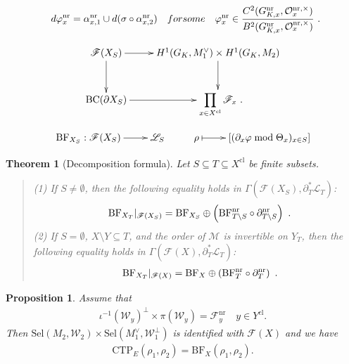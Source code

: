 \documentclass[10pt,a4paper]{amsart}
\newtheorem{thm}{Theorem}
\newtheorem{prop}{Proposition}
\begin{document}
\begin{align}\label{BFnrx-lift}
    d\varphi_x^\mathrm{nr}=\alpha_{x,1}^\mathrm{nr}\cup d(\sigma\circ\alpha_{x,2}^\mathrm{nr})\quad\textrm{for some}\quad\varphi_x^\mathrm{nr}\in\frac{C^2(G_{K,x}^\mathrm{nr},\mathcal{O}_x^{\mathrm{nr},\times})}{B^2(G_{K,x}^\mathrm{nr},\mathcal{O}_x^{\mathrm{nr},\times})}\rlap{\ .}
\end{align}

\begin{align}\label{FXS-defn}
\begin{aligned}
    \xymatrix{
    \mathscr{F}(X_S) \ar[d] \ar[r] & H^1(G_K,M_1^\vee)\times H^1(G_K,M_2) \ar[d] \\
    \mathrm{BC}(\partial X_S) \ar[r] & \displaystyle\prod_{x\in X^\mathrm{cl}}\mathscr{F}_x\rlap{\ .}
    }
\end{aligned}
\end{align}

\begin{align}\label{FUS-BF-functional}
    \xymatrix{\mathrm{BF}_{X_S}:\mathscr{F}(X_S) \ar[r] & \mathscr{L}_S & \rho \ar@{|->}[r] & [(\partial_x\varphi\bmod\Theta_x)_{x\in S}]}
\end{align}

\begin{thm}[Decomposition formula]\label{Decomp-formula} Let $S\subseteq T\subseteq X^\mathrm{cl}$ be finite subsets.
\begin{quote}
    (1) If $S\neq\emptyset$, then the following equality holds in $\Gamma(\mathscr{F}(X_S),\partial_T^\ast\mathscr{L}_T)$:
    \begin{align*}
        \mathrm{BF}_{X_T}|_{\mathscr{F}(X_S)}=\mathrm{BF}_{X_S}\oplus\left(\mathrm{BF}_{T\setminus S}^\mathrm{nr}\circ\partial^\mathrm{nr}_{T\setminus S}\right)\rlap{\ .}
    \end{align*}
    (2) If $S=\emptyset$, $X\setminus Y\subseteq T$, and the order of $\mathcal{M}$ is invertible on $Y_T$, then the following equality holds in $\Gamma(\mathscr{F}(X),\partial_T^\ast\mathscr{L}_T)$:
    \begin{align*}
        \mathrm{BF}_{X_T}|_{\mathscr{F}(X)}=\mathrm{BF}_X\oplus\left(\mathrm{BF}_T^\mathrm{nr}\circ\partial_T^\mathrm{nr}\right)\rlap{\ .}
    \end{align*}
\end{quote}
\end{thm}

\begin{prop} \label{ctpbf}
Assume that
\begin{eqnarray}
    \iota^{-1}(\mathscr{W}_y)^{\perp}\times \pi(\mathscr{W}_y)= \mathscr{F}_y^\mathrm{nr}
    \quad y \in Y^{\mathrm{cl}}.
\end{eqnarray}
Then $\mathrm{Sel} (M_2,\mathscr{W}_2) \times \mathrm{Sel} (M_1^\vee, \mathscr{W}_1^\perp)$ is identified with $\mathscr{F}(X)$ and we have
    \begin{eqnarray*}
        \mathrm{CTP}_E(\rho_1, \rho_2)= \mathrm{BF}_X(\rho_1, \rho_2).
    \end{eqnarray*}
\end{prop}
\end{document}
